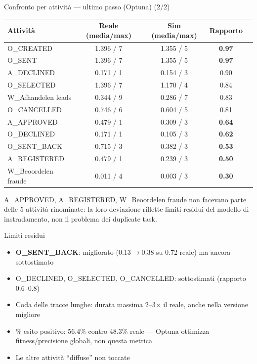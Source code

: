\documentclass[11pt,aspectratio=169]{beamer}
\newcommand{\good}[1]{\textcolor{goodcol}{\textbf{#1}}}
\newcommand{\warncell}[1]{\textcolor{warncol}{\textbf{#1}}}
\begin{document}
\begin{frame}{Confronto per attivit\`a --- ultimo passo (Optuna) (2/2)}
\centering
\scriptsize
\begin{tabular}{lcccc}
\toprule
\textbf{Attivit\`a} & \textbf{Reale (media/max)} & \textbf{Sim (media/max)} & \textbf{Rapporto} \\
\midrule
O\_CREATED & 1.396 / 7 & 1.355 / 5 & \good{0.97} \\
O\_SENT & 1.396 / 7 & 1.355 / 5 & \good{0.97} \\
A\_DECLINED & 0.171 / 1 & 0.154 / 3 & 0.90 \\
O\_SELECTED & 1.396 / 7 & 1.170 / 4 & 0.84 \\
W\_Afhandelen leads & 0.344 / 9 & 0.286 / 7 & 0.83 \\
O\_CANCELLED & 0.746 / 6 & 0.604 / 5 & 0.81 \\
A\_APPROVED & 0.479 / 1 & 0.309 / 3 & \warncell{0.64} \\
O\_DECLINED & 0.171 / 1 & 0.105 / 3 & \warncell{0.62} \\
O\_SENT\_BACK & 0.715 / 3 & 0.382 / 3 & \warncell{0.53} \\
A\_REGISTERED & 0.479 / 1 & 0.239 / 3 & \warncell{0.50} \\
W\_Beoordelen fraude & 0.011 / 4 & 0.003 / 3 & \warncell{0.30} \\
\bottomrule
\end{tabular}
\vspace{0.8em}

{\small A\_APPROVED, A\_REGISTERED, W\_Beoordelen fraude non facevano parte delle 5 attivit\`a rinominate: la loro deviazione riflette limiti residui del modello di instradamento, non il problema dei duplicate task.}
\end{frame}

\begin{frame}{Limiti residui}
\begin{itemize}
\item \textbf{O\_SENT\_BACK}: migliorato (0.13$\to$0.38 su 0.72 reale) ma ancora sottostimato
\item O\_DECLINED, O\_SELECTED, O\_CANCELLED: sottostimati (rapporto 0.6--0.8)
\item Coda delle tracce lunghe: durata massima 2--3$\times$ il reale, anche nella versione migliore
\item \% esito positivo: 56.4\% contro 48.3\% reale --- Optuna ottimizza fitness/precisione globali, non questa metrica
\item Le altre attivit\`a ``diffuse'' non toccate
\end{itemize}
\end{frame}
\end{document}
